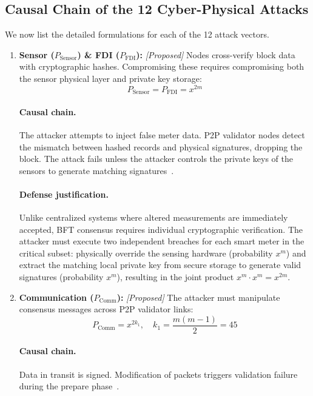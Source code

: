 \documentclass[10pt,twocolumn,journal]{IEEEtran}
\begin{document}
\subsection{Causal Chain of the 12 Cyber-Physical Attacks}
\label{sec:twelve_attacks}

We now list the detailed formulations for each of the 12 attack vectors.

\begin{enumerate}[leftmargin=*]
    \item \textbf{Sensor ($P_{\mathrm{Sensor}}$) \& FDI ($P_{\mathrm{FDI}}$):} \emph{[Proposed]} Nodes cross-verify block data with cryptographic hashes. Compromising these requires compromising both the sensor physical layer and private key storage:
    \begin{equation}
    \label{eq:sensor_fdi_bc}
    P_{\mathrm{Sensor}} = P_{\mathrm{FDI}} = x^{2m}
    \end{equation}
    \paragraph{Causal chain.} The attacker attempts to inject false meter data. P2P validator nodes detect the mismatch between hashed records and physical signatures, dropping the block. The attack fails unless the attacker controls the private keys of the sensors to generate matching signatures~\cite{ding2024}.
    \paragraph{Defense justification.} Unlike centralized systems where altered measurements are immediately accepted, BFT consensus requires individual cryptographic verification. The attacker must execute two independent breaches for each smart meter in the critical subset: physically override the sensing hardware (probability $x^m$) and extract the matching local private key from secure storage to generate valid signatures (probability $x^m$), resulting in the joint product $x^m \cdot x^m = x^{2m}$.

    \item \textbf{Communication ($P_{\mathrm{Comm}}$):} \emph{[Proposed]} The attacker must manipulate consensus messages across P2P validator links:
    \begin{equation}
    \label{eq:comm_bc}
    P_{\mathrm{Comm}} = x^{2k_1}, \quad k_1 = \frac{m(m-1)}{2} = 45
    \end{equation}
    \paragraph{Causal chain.} Data in transit is signed. Modification of packets triggers validation failure during the prepare phase~\cite{castro1999}.

\end{enumerate}
\end{document}
